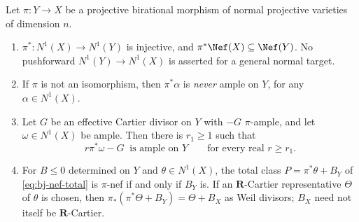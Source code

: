 \begin{lemma}
\label{lem:ch38-numerical-birational}
Let $\pi:Y\to X$ be a projective birational morphism of normal
projective varieties of dimension $n$.
\begin{enumerate}
\item\label{itm:ch38-num:inj}
 $\pi^*:N^1(X)\to N^1(Y)$ is injective, and
 $\pi^*\Nef(X)\subseteq\Nef(Y)$. No pushforward
 $N^1(Y)\to N^1(X)$ is asserted for a general normal target.
\item\label{itm:ch38-num:notample}
 If $\pi$ is not an isomorphism, then $\pi^*\alpha$ is \emph{never}
 ample on $Y$, for any $\alpha\in N^1(X)$.
\item\label{itm:ch38-num:relative}
 Let $G$ be an effective Cartier divisor on $Y$ with $-G$
 $\pi$-ample, and let $\omega\in N^1(X)$ be ample.  Then there is
 $r_1\geq1$ such that
\[
 r\pi^*\omega-G\ \text{ is ample on }Y
 \qquad\text{for every real }r\geq r_1 .
\tag{38.19}\label{eq:ch38-relative-to-absolute}
\]
\item\label{itm:ch38-num:total}
 For $B\leq0$ determined on $Y$ and $\theta\in N^1(X)$, the total
 class $P=\pi^*\theta+B_Y$ of \eqref{eq:bj-nef-total}
 is $\pi$-nef if and only if $B_Y$ is. If an
 $\mathbf R$-Cartier representative $\Theta$ of $\theta$ is chosen,
 then $\pi_*(\pi^*\Theta+B_Y)=\Theta+B_X$ as Weil divisors;
 $B_X$ need not itself be $\mathbf R$-Cartier.
\end{enumerate}
\end{lemma}

